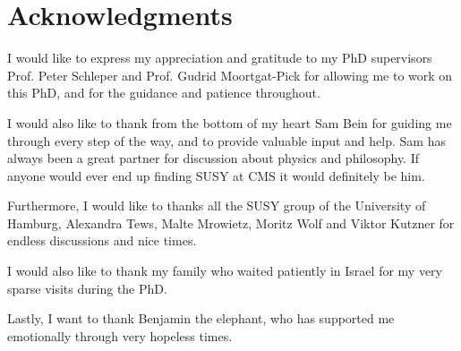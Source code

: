 \chapter{Acknowledgments}

I would like to express my appreciation and gratitude to my PhD supervisors Prof. Peter Schleper and Prof. Gudrid Moortgat-Pick for allowing me to work on this PhD, and for the guidance and patience throughout.

I would also like to thank from the bottom of my heart Sam Bein for guiding me through every step of the way, and to provide valuable input and help. Sam has always been a great partner for discussion about physics and philosophy. If anyone would ever end up finding SUSY at CMS it would definitely be him.

Furthermore, I would like to thanks all the SUSY group of the University of Hamburg, Alexandra Tews, Malte Mrowietz, Moritz Wolf and Viktor Kutzner for endless discussions and nice times.

I would also like to thank my family who waited patiently in Israel for my very sparse visits during the PhD.

Lastly, I want to thank Benjamin the elephant, who has supported me emotionally through very hopeless times. 